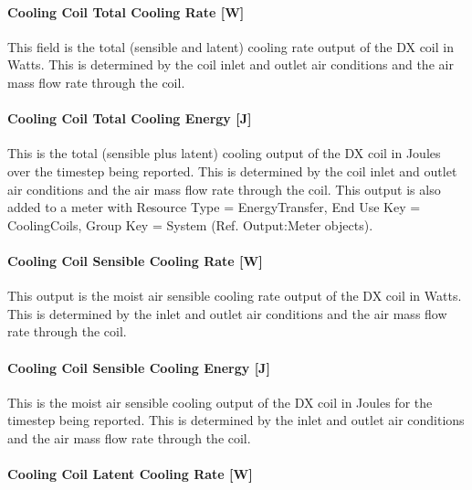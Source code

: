 \paragraph{Cooling Coil Total Cooling Rate {[}W{]}}\label{cooling-coil-total-cooling-rate-w}

This field is the total (sensible and latent) cooling rate output of the DX coil in Watts. This is determined by the coil inlet and outlet air conditions and the air mass flow rate through the coil.

\paragraph{Cooling Coil Total Cooling Energy {[}J{]}}\label{cooling-coil-total-cooling-energy-j}

This is the total (sensible plus latent) cooling output of the DX coil in Joules over the timestep being reported. This is determined by the coil inlet and outlet air conditions and the air mass flow rate through the coil. This output is also added to a meter with Resource Type = EnergyTransfer, End Use Key = CoolingCoils, Group Key = System (Ref. Output:Meter objects).

\paragraph{Cooling Coil Sensible Cooling Rate {[}W{]}}\label{cooling-coil-sensible-cooling-rate-w}

This output is the moist air sensible cooling rate output of the DX coil in Watts. This is determined by the inlet and outlet air conditions and the air mass flow rate through the coil.

\paragraph{Cooling Coil Sensible Cooling Energy {[}J{]}}\label{cooling-coil-sensible-cooling-energy-j}

This is the moist air sensible cooling output of the DX coil in Joules for the timestep being reported. This is determined by the inlet and outlet air conditions and the air mass flow rate through the coil.

\paragraph{Cooling Coil Latent Cooling Rate {[}W{]}}\label{cooling-coil-latent-cooling-rate-w-2}

